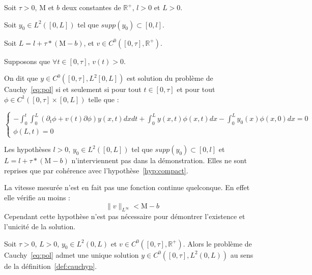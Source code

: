 \documentclass[a4paper]{article}
\newcommand{\mass}{\mathrm{M}}
\newcommand{\dep}{b}
\begin{document}
\begin{definition}
	\label{def:cauchyp}
	Soit $\tau>0$, $\mass$ et $\dep$ deux constantes de $\mathbb{R}^+$, 
	$l>0$ et $L>0$. 
	
	Soit $y_0 \in L^2([0,L])$ tel que $supp(y_0) \subset [0,l]$.
	
	Soit $L=l+\tau*(\mass-\dep)$, et $v \in C^0([0,\tau],\mathbb{R}^+)$.
	
	Supposons que $\forall t \in[0,\tau]$, $v(t)>0$.
	
	On dit que $y \in C^0([0,\tau],L^2[0,L])$ est solution du problème de Cauchy~\eqref{eq:pol}  
	si et seulement si pour tout $t \in [0,\tau]$ et pour
	tout $\phi \in C^1([0,\tau]\times [0,L])$ telle que :
	
	\begin{equation}
		\begin{cases}
			-\int_0^t \int_0^L (\partial_t \phi +v(t)\partial \phi) y(x,t) dxdt 
			+ \int_0^L y(x,t) \phi (x,t) dx - \int_0^L y_0(x)\phi(x,0)dx =0 \\
			\phi(L,t)=0
		\end{cases}
	\end{equation}
	
\end{definition}

\begin{remarque}
	Les hypothèses $l>0$, $y_0 \in L^2([0,L])$ tel que $supp(y_0) \subset [0,l]$ et $L=l+\tau*(\mass-\dep)$ n'interviennent pas dans la démonstration. 
	Elles ne sont reprises que par cohérence avec l'hypothèse~\eqref{hyp:compact}.
\end{remarque}

\begin{remarque}
	La vitesse mesurée n'est en fait pas une fonction continue quelconque.
	En effet elle vérifie au moins :
	\[\|v\|_{L^{\infty}} < \mass-\dep \]
	Cependant cette hypothèse n'est pas nécessaire pour démontrer l'existence et l'unicité de la solution.
\end{remarque}

\begin{theoreme}
	Soit $\tau >0$, $L>0$, $y_0 \in L^2(0,L)$ et $v \in C^0([0,\tau],\mathbb{R}^+)$.
	Alors le problème de Cauchy~\eqref{eq:pol} admet une unique solution $y \in C^0([0,\tau],L^2(0,L))$ au sens de la définition~\ref{def:cauchyp}.
\end{theoreme}
\end{document}
